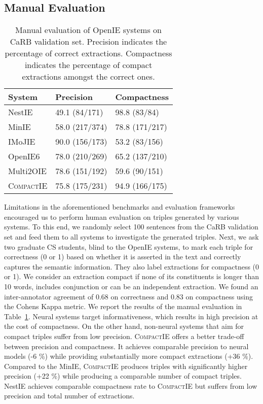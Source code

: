 \documentclass[11pt,a4paper]{article}
\newcommand{\system}{{\textsc{CompactIE}}}
\begin{document}
\subsection{Manual Evaluation}
\label{manual_evaluation}

\begin{table}
\begin{center}
\resizebox{0.85\linewidth}{!} {
\begin{tabular}{lll} 
\hline
\textbf{System} & \textbf{Precision} & \textbf{Compactness}\\
\hline
NestIE & 49.1 (84/171) & 98.8 (83/84)\\ 
MinIE & 58.0 (217/374) & 78.8 (171/217) \\
\hline
IMoJIE & 90.0 (156/173) & 53.2 (83/156) \\ 
OpenIE6 & 78.0 (210/269) & 65.2 (137/210)\\
Multi2OIE & 78.6 (151/192) & 59.6 (90/151)\\
\hline
\system{} & 75.8 (175/231) & 94.9 (166/175) \\
\hline
\end{tabular}
}
\end{center}
\caption{\label{minimality_precision} Manual evaluation of OpenIE systems on CaRB validation set. Precision indicates the percentage of correct extractions. Compactness indicates the percentage of compact extractions amongst the correct ones.
}
\end{table}

{Limitations in the aforementioned benchmarks and evaluation frameworks encouraged us to perform human evaluation on triples generated by various systems. To this end, we randomly select 100 sentences from the CaRB validation set and feed them to all systems to investigate the generated triples.} 
Next, we ask two graduate CS students, blind to the OpenIE systems, to mark each triple for correctness (0 or 1) based on whether it is asserted in the text and correctly captures the semantic information. They also label extractions for compactness (0 or 1). We consider an extraction compact if  none of its constituents is longer than 10 words, includes conjunction or can be an independent extraction. We found an inter-annotator agreement of 0.68 on correctness and 0.83 on compactness using the Cohens Kappa metric. We report the results of the manual evaluation in Table~\ref{minimality_precision}. Neural systems target informativeness, which results in high precision at the cost of compactness. On the other hand, non-neural systems that aim for compact triples suffer from low precision. \system{} offers a better trade-off between precision and compactness. It achieves comparable precision to neural models (-6 \%) while providing substantially more compact extractions (+36 \%). Compared to the MinIE, \system{} produces triples with significantly higher precision (+22 \%) while producing a comparable number of compact triples. NestIE achieves comparable compactness rate to \system{} but suffers from low precision and total number of extractions.
\end{document}
